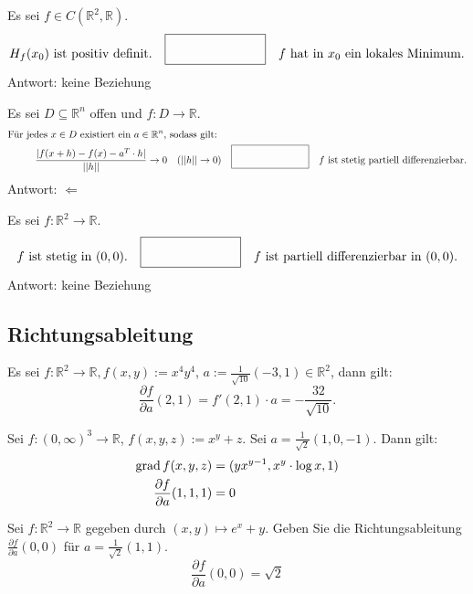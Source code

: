 Es sei $f \in C(\mathbb{R}^2, \mathbb{R})$.
\begin{displaymath}
  H_f(x_0) \text{ ist positiv definit.} \quad \fbox{\rule{1in}{0pt}\rule[-0.5ex]{0pt}{4ex}} \quad f \text{ hat in } x_0 \text{ ein lokales Minimum.}
\end{displaymath}
Antwort: keine Beziehung

Es sei $D \subseteq \mathbb{R}^n$ offen und $f : D \to \mathbb{R}$.
\begin{align*}
  \text{Für jedes } x \in D \text{ existiert ein } a \in \mathbb{R}^n \text{, sodass gilt: }&\\
  \frac{|f(x + h) - f(x) - a^T \cdot h|}{||h||} \to 0 \quad (||h|| \to 0)& \quad \fbox{\rule{1in}{0pt}\rule[-0.5ex]{0pt}{4ex}} \quad f \text{ ist stetig partiell differenzierbar.}
\end{align*}
Antwort: $\Leftarrow$

Es sei $f : \mathbb{R}^2 \to \mathbb{R}$.
\begin{displaymath}
  f \text{ ist stetig in } (0,0).
  \quad \fbox{\rule{1in}{0pt}\rule[-0.5ex]{0pt}{4ex}} \quad
  f \text{ ist partiell differenzierbar in } (0,0).
\end{displaymath}
Antwort: keine Beziehung

\subsection{Richtungsableitung}
Es sei $f : \mathbb{R}^2 \to \mathbb{R}, f(x,y) := x^4 y^4$, $a := \frac{1}{\sqrt{10}}(-3,1) \in \mathbb{R}^2$, dann gilt:
\begin{displaymath}
  \frac{\partial f}{\partial a} \left(2,1\right) = f'(2,1) \cdot a = -\frac{32}{\sqrt{10}}.
\end{displaymath}

Sei $f : (0,\infty)^3 \to \mathbb{R}$, $f(x,y,z) := x^y + z$.
Sei $a = \frac{1}{\sqrt{2}}(1, 0, -1)$.
Dann gilt:
\begin{align*}
  \operatorname{grad} f(x,y,z) &= (yx^{y - 1}, x^y \cdot \log x, 1)\\
  \frac{\partial f}{\partial a} (1,1,1) &= 0
\end{align*}

Sei $f : \mathbb{R}^2 \to \mathbb{R}$ gegeben durch $(x,y) \mapsto e^x + y$.
Geben Sie die Richtungsableitung $\frac{\partial f}{\partial a}(0,0)$ für $a = \frac{1}{\sqrt{2}} (1,1)$.
\begin{displaymath}
  \frac{\partial f}{\partial a} (0,0) = \sqrt{2}
\end{displaymath}

